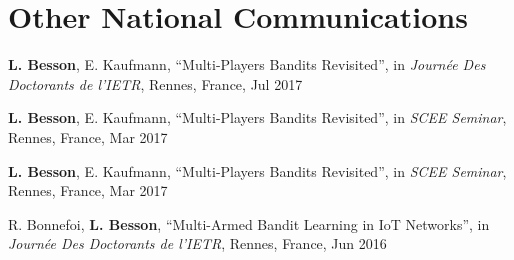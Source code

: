 

\section*{Other National Communications}
\renewcommand{\labelenumi}{[ONC-\arabic{enumi}]}
\begin{etaremune}
	\item \textbf{L. Besson}, E. Kaufmann, ``Multi-Players Bandits Revisited'', in \emph{Journ\'{e}e Des Doctorants de l'IETR}, Rennes, France, Jul 2017
	\item \textbf{L. Besson}, E. Kaufmann, ``Multi-Players Bandits Revisited'', in \emph{SCEE Seminar}, Rennes, France, Mar 2017
	\item \textbf{L. Besson}, E. Kaufmann, ``Multi-Players Bandits Revisited'', in \emph{SCEE Seminar}, Rennes, France, Mar 2017
	\item	R. Bonnefoi, \textbf{L. Besson}, ``Multi-Armed Bandit Learning in IoT Networks'', in \emph{Journ\'{e}e Des Doctorants de l'IETR}, Rennes, France, Jun 2016
\end{etaremune}


